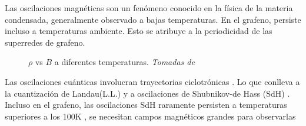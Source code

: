\begin{frame}
	\justifying
	Las oscilaciones magnéticas son un fenómeno conocido en la física de la materia condensada, generalmente observado a bajas temperaturas.
	En el grafeno, persiste incluso a temperaturas ambiente. Esto se atribuye a la periodicidad de las superredes de grafeno\cite{Kumar2017}.

	\begin{figure}
	\caption{$\rho$ vs $B$ a diferentes temperaturas. \textit{Tomadas de \cite{Kumar2017}}}
	\end{figure}
\end{frame}

\begin{frame}
	\justifying
	\begin{multicols}{2}
		Las oscilaciones cuánticas involucran trayectorias ciclotrónicas \cite{Chen2014}. Lo que conlleva a la cuantización de Landau(L.L.) y a oscilaciones de Shubnikov-de Hass (SdH) \cite{Fujita2014}.
		Incluso en el grafeno, las oscilaciones SdH raramente persisten a temperaturas superiores a los 100K \cite{Kishigi2014}, se necesitan campos magnéticos grandes para observarlas \cite{Novoselov2007}
	\end{multicols}
\end{frame}

